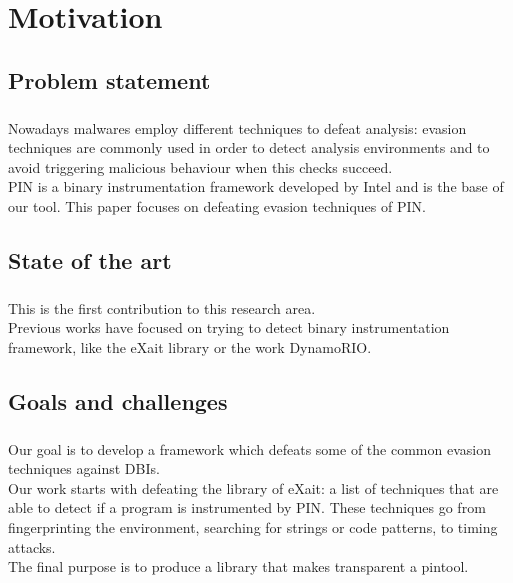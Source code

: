 \chapter{Motivation}
\label{chapter2}
\thispagestyle{empty}

\section{Problem statement}
\paragraph{}
Nowadays malwares employ different techniques to defeat analysis: evasion techniques are commonly used in order to detect analysis environments and to avoid triggering malicious behaviour when this checks succeed.\\
PIN is a binary instrumentation framework developed by Intel and is the base of our tool. This paper focuses on defeating evasion techniques of PIN.
\section{State of the art}
\paragraph{}
This is the first contribution to this research area.\\
Previous works have focused on trying to detect binary instrumentation framework, like the eXait library or the work DynamoRIO.
\section{Goals and challenges}
\paragraph{}
Our goal is to develop a framework which defeats some of the common evasion techniques against DBIs.\\
Our work starts with defeating the library of eXait: a list of techniques that are able to detect if a program is instrumented by PIN. These techniques go from fingerprinting the environment, searching for strings or code patterns, to timing attacks.\\
The final purpose is to produce a library that makes transparent a pintool.
